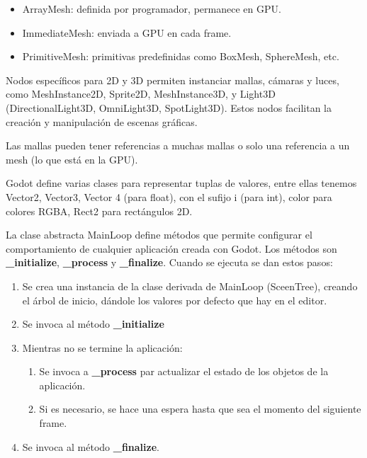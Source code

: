 \documentclass[12pt]{report} %
\providecommand{\tightlist}{%
  \setlength{\itemsep}{0pt}\setlength{\parskip}{0pt}}
\begin{document}
\begin{itemize}
\tightlist
\item
  ArrayMesh: definida por programador, permanece en GPU.
\item
  ImmediateMesh: enviada a GPU en cada frame.
\item
  PrimitiveMesh: primitivas predefinidas como BoxMesh, SphereMesh, etc.
\end{itemize}

Nodos específicos para 2D y 3D permiten instanciar mallas, cámaras y
luces, como MeshInstance2D, Sprite2D, MeshInstance3D, y Light3D
(DirectionalLight3D, OmniLight3D, SpotLight3D). Estos nodos facilitan la
creación y manipulación de escenas gráficas.

Las mallas pueden tener referencias a muchas mallas o solo una
referencia a un mesh (lo que está en la GPU).

Godot define varias clases para representar tuplas de valores, entre
ellas tenemos Vector2, Vector3, Vector 4 (para float), con el sufijo i
(para int), color para colores RGBA, Rect2 para rectángulos 2D.

La clase abstracta MainLoop define métodos que permite configurar el
comportamiento de cualquier aplicación creada con Godot. Los métodos son
\textbf{\_initialize}, \textbf{\_process} y \textbf{\_finalize}. Cuando
se ejecuta se dan estos pasos:

\begin{enumerate}
\def\labelenumi{\arabic{enumi}.}
\tightlist
\item
  Se crea una instancia de la clase derivada de MainLoop (SceenTree),
  creando el árbol de inicio, dándole los valores por defecto que hay en
  el editor.
\item
  Se invoca al método \textbf{\_initialize}
\item
  Mientras no se termine la aplicación:

  \begin{enumerate}
  \def\labelenumii{\arabic{enumii}.}
  \tightlist
  \item
    Se invoca a \textbf{\_process} par actualizar el estado de los
    objetos de la aplicación.
  \item
    Si es necesario, se hace una espera hasta que sea el momento del
    siguiente frame.
  \end{enumerate}
\item
  Se invoca al método \textbf{\_finalize}.
\end{enumerate}
\end{document}
